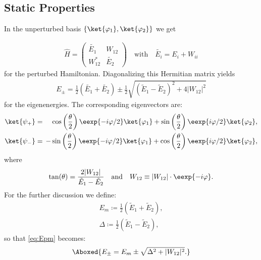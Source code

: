 		\subsection{Static Properties}

			In the unperturbed basis $\left\{\ket{\varphi_1},\ket{\varphi_2}\right\}$ we get

			\begin{align}
				\hat{H} = \left(\begin{array}{cc} \tilde{E_1} & W_{12} \\ W^*_{12} & \tilde{E_2}\end{array}\right) \quad \text{with} \quad \tilde{E_i} = E_i + W_{ii}
			\end{align}
			for the perturbed Hamiltonian. Diagonalizing this Hermitian matrix yields
			\begin{align}\label{eq:Epm}
				E_\pm = \frac{1}{2}\left(\tilde{E_1}+\tilde{E_2}\right) \pm \frac{1}{2} \sqrt{\left(\tilde{E}_1-\tilde{E}_2\right)^2+4 \left|W_{12}\right|^2}
			\end{align}
			for the eigenenergies. The corresponding eigenvectors are:
			\begin{align}
				\ket{\psi_+}&=&\hspace{-2mm}&\cos\left(\frac{\theta}{2}\right) \eexp{-i{\varphi}/{2}}\ket{\varphi_1}+\sin\left(\frac{\theta}{2}\right) \eexp{i{\varphi}/{2}}\ket{\varphi_2}, \label{eq:staticpsiplus} \\ 
				\ket{\psi_-}&=&\hspace{-2mm}-&\sin\left(\frac{\theta}{2}\right) \eexp{-i{\varphi}/{2}}\ket{\varphi_1}+\cos\left(\frac{\theta}{2}\right) \eexp{i{\varphi}/{2}}\ket{\varphi_2}, \label{eq:staticpsiminus}
			\end{align}
			where 
			\begin{align} \label{eq:parameters}
				\tan(\theta) = \frac{2|W_{12}|}{\tilde{E}_1-\tilde{E}_2} \quad \text{and} \quad W_{12} \equiv |W_{12}|\cdot \eexp{-i\varphi}.
			\end{align}
			For the further discussion we define:
			\begin{align}
				E_m \coloneqq \frac{1}{2}\left(\tilde{E}_1+\tilde{E}_2\right),\\
				\Delta \coloneqq \frac{1}{2}\left(\tilde{E}_1-\tilde{E}_2\right),
			\end{align}
			so that \eqref{eq:Epm} becomes:
			\begin{align}
				\Aboxed{E_\pm = E_m \pm \sqrt{\Delta^2+|W_{12}|^2}.}
			\end{align}

